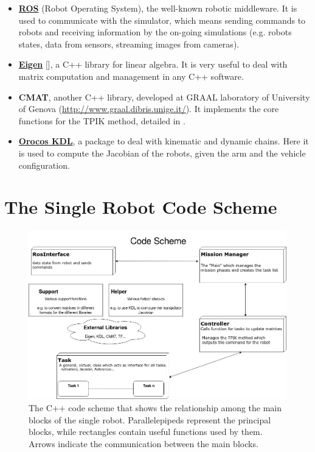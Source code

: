 \begin{itemize}
	\item \href{http://www.ros.org/}{\textbf{ROS}} (Robot Operating System), the well-known robotic middleware. It is used to communicate with the simulator, which means sending commands to robots and receiving information by the on-going simulations (e.g. robots states, data from sensors, streaming images from cameras).
	
	\item \href{http://eigen.tuxfamily.org/index.php?title=Main_Page}{\textbf{Eigen}} [\cite{eigen}], a C++ library for linear algebra. It is very useful to deal with matrix computation and management in any C++ software.
	
	\item \textbf{CMAT}, another C++ library, developed at GRAAL laboratory of University of Genova (\url{http://www.graal.dibris.unige.it/}). It implements the core functions for the TPIK method, detailed in \cite{IntroMaris1}.
	
	\item \href{http://www.orocos.org/kdl}{\textbf{Orocos KDL}}, a package to deal with kinematic and dynamic chains. Here it is used to compute the Jacobian of the robots, given the arm and the vehicle configuration.
\end{itemize}

\section{The Single Robot Code Scheme}
\begin{figure}[H]
	\begin{center}
		\includegraphics[width=1\columnwidth]{CodeScheme_single.png}
		\caption[C++ code scheme for the single robot]{The C++ code scheme that shows the relationship among the main blocks of the single robot. Parallelepipeds represent the principal blocks, while rectangles contain useful functions used by them. Arrows indicate the communication between the main blocks.}
		\label{fig:codeSchemeSingle}
	\end{center}
\end{figure}

